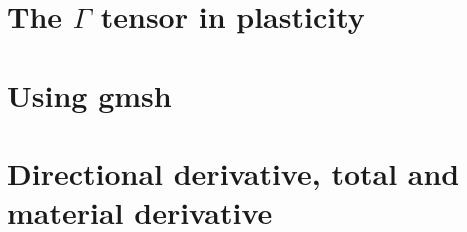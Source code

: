 \documentclass[a4paper,12pt]{report}
\begin{document}
\chapter{The $\Gamma$ tensor in plasticity}  %
\chapter{Using gmsh \label{app:gmsh}}  %
\chapter{Directional derivative, total and material derivative \label{app:ders}}  %

\printbibliography

\newpage
{}
\end{document}
